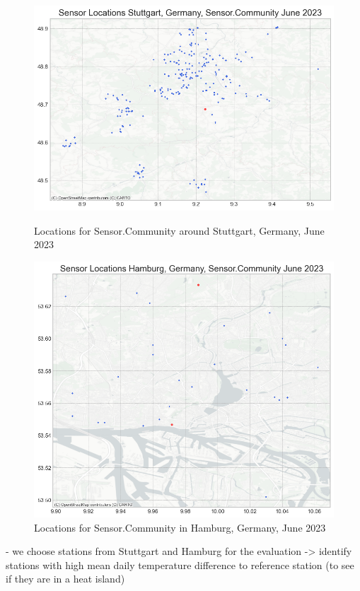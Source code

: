 \begin{figure}[ht]
    \centering
    \includegraphics[width=1\textwidth]{images/sensor_community_locations_stuttgart_after_qc_june_23.png}
    \caption{Locations for Sensor.Community around Stuttgart, Germany, June 2023}
    \label{fig:qc sensor community stuttgart june 23}

    \includegraphics[width=1\textwidth]{images/sensor_community_locations_hamburg_after_qc_june_23.png}
    \caption{Locations for Sensor.Community in Hamburg, Germany, June 2023}
    \label{fig:qc sensor community hamburg june 23}
\end{figure}

- we choose stations from Stuttgart and Hamburg for the evaluation
-> identify stations with high mean daily temperature difference to reference station (to see if they are in a heat island)

